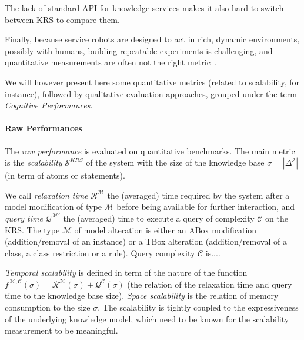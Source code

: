 The lack of standard API for knowledge services makes it also hard to switch
between KRS to compare them.

Finally, because service robots are designed to act in rich, dynamic
environments, possibly with humans, building repeatable experiments is
challenging, and quantitative measurements are often not the right
metric~\cite{Langley2006}.

We will however present here some quantitative metrics (related to scalability,
for instance), followed by qualitative evaluation approaches, grouped under the
term \emph{Cognitive Performances}.

\begin{scriptsize}
\begin{center}
\end{center}
\end{scriptsize}


\paragraph{Raw Performances} The \emph{raw performance} is evaluated on
quantitative benchmarks. The main metric is the \emph{scalability}
$\mathcal{S}^{KRS}$ of the system with the size of the knowledge base
$\sigma=|\Delta^{\mathcal{I}}|$  (in term of atoms or statements).

We call \emph{relaxation time} $\mathcal{R}^{\mathcal{M}}$ the (averaged) time
required by the system after a model modification of type $\mathcal{M}$ before
being available for further interaction, and \emph{query time}
$\mathcal{Q}^{\mathcal{M}'}$ the (averaged) time to execute a query of
complexity $\mathcal{C}$ on the KRS. The type $\mathcal{M}$ of model
alteration is either an ABox modification (addition/removal of an instance) or
a TBox alteration (addition/removal of a class, a class restriction or a rule).
Query complexity $\mathcal{C}$ is....

\emph{Temporal scalability} is defined in term of the nature of the function
$f^{\mathcal{M}, \mathcal{C}}(\sigma) = \mathcal{R}^{\mathcal{M}}(\sigma) +
\mathcal{Q}^{\mathcal{C}}(\sigma)$ (\ie the relation of the relaxation time
and query time to the knowledge base size). \emph{Space scalability} is the
relation of memory consumption to the size $\sigma$. The scalability is tightly
coupled to the expressiveness of the underlying knowledge model, which need to
be known for the scalability measurement to be meaningful.

